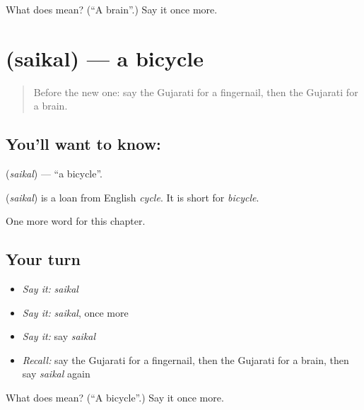 \begin{tcolorbox}[breakable,colback=teal!4,colframe=teal!35!black,title={Before you move on}]
What does  mean? (\textquotedblleft{}A brain\textquotedblright{}.) Say it once more.
\end{tcolorbox}
\section[\texorpdfstring{\gu{સાઈકલ} (saikal)}{સાઈકલ (saikal)}]{ (saikal) — a bicycle}

\label{lesson:GU-C127-saikal}



\begin{quote}
Before the new one: say the Gujarati for a fingernail, then the Gujarati for a brain.
\end{quote}

\subsection*{You'll want to know: }
\textbf{} (\emph{saikal}) — \textquotedblleft{}a bicycle\textquotedblright{}.

\begin{cousinweb}
\textbf{} (\emph{saikal}) is a loan from English \emph{cycle}. It is short for \emph{bicycle}.
\end{cousinweb}

\begin{grammarlens}[title={What you've built}]
One more word for this chapter.
\end{grammarlens}

\subsection*{Your turn}
\begin{itemize}
\raggedright
  \item \emph{Say it:} \emph{saikal}
  \item \emph{Say it:} \emph{saikal}, once more
  \item \emph{Say it:} say \emph{saikal}
  \item \emph{Recall:} say the Gujarati for a fingernail, then the Gujarati for a brain, then say \emph{saikal} again
\end{itemize}

\begin{tcolorbox}[breakable,colback=teal!4,colframe=teal!35!black,title={Before you move on}]
What does  mean? (\textquotedblleft{}A bicycle\textquotedblright{}.) Say it once more.
\end{tcolorbox}
